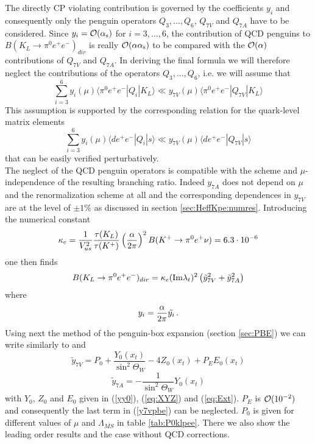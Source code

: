 The directly CP violating contribution is governed by the coefficients
$y_i$ and consequently only the penguin operators $Q_3,\ldots, Q_6$,
$Q_{7V}$ and $Q_{7A}$ have to be considered. Since
$y_i={\cal O}(\alpha_{\rm s})$ for $i=3,\ldots, 6$, the contribution of
QCD penguins to $B(K_L\to\pi^0e^+e^-)_{dir}$ is really
${\cal O}(\alpha\alpha_{\rm s})$ to be compared with the ${\cal O}(\alpha)$
contributions of $Q_{7V}$ and $Q_{7A}$. In deriving the final
formula we will therefore neglect the contributions of the
operators $Q_3,\ldots, Q_6$, i.e. we will assume that
\begin{equation}\label{qillq7v1}
\sum_{i=3}^6 y_i(\mu)\langle\pi^0e^+e^-|Q_i|K_L\rangle\ll
y_{7V}(\mu)\langle\pi^0e^+e^-|Q_{7V}|K_L\rangle
\end{equation}
This assumption is supported by the corresponding relation for the
quark-level matrix elements
\begin{equation}\label{qillq7v2}
\sum_{i=3}^6 y_i(\mu)\langle d e^+e^-|Q_i| s \rangle\ll
y_{7V}(\mu)\langle d e^+e^-|Q_{7V}| s \rangle
\end{equation}
that can be easily verified perturbatively.
\\
The neglect of the QCD penguin operators is compatible with the scheme
and $\mu$-independence of the resulting branching ratio.  Indeed
$y_{7A}$ does not depend on $\mu$ and the renormalization scheme at all
and the corresponding dependences in $y_{7V}$ are at the level of $\pm
1\%$ as discussed in section \ref{sec:HeffKpe:numres}.  Introducing the
numerical constant
\begin{equation}
\label{kappae}
\kappa_e=\frac{1}{V_{us}^2}\frac{\tau(K_L)}{\tau(K^+)}
\left( \frac{\alpha}{2 \pi} \right)^2 B(K^+\to\pi^0e^+\nu)
= 6.3 \cdot 10^{-6}
\end{equation}
one then finds
\begin{equation}\label{bklpedir}
B(K_L\to\pi^0e^+e^-)_{dir}=\kappa_e ({\rm Im}\lambda_t)^2
\left(\tilde{y}_{7V}^2 + \tilde{y}_{7A}^2\right)
\end{equation}
where
\begin{equation}
y_i = \frac{\alpha}{2 \pi} \tilde{y_i} \, .
\label{eq:ytilde}
\end{equation}
Using next the method of the penguin-box expansion
(section \ref{sec:PBE}) we can write similarly to  and
\begin{equation}\label{y7vpbe}
\tilde{y}_{7V} =
P_0 + \frac{Y_0(x_t)}{\sin^2\Theta_W} - 4 Z_0(x_t)+ P_E E_0(x_t)
\end{equation}
\begin{equation}\label{y7apbe}
\tilde{y}_{7A}=-\frac{1}{\sin^2\Theta_W} Y_0(x_t)
\end{equation}
with $Y_0$, $Z_0$ and $E_0$ given in (\ref{yy0}), (\ref{eq:XYZ}) and
(\ref{eq:Ext}).  $P_E$ is ${\cal O}(10^{-2})$ and consequently the last
term in (\ref{y7vpbe}) can be neglected. $P_0$ is given for different
values of $\mu$ and $\Lambda_{\overline{MS}}$ in table
\ref{tab:P0klpee}.  There we also show the leading order results and
the case without QCD corrections.

